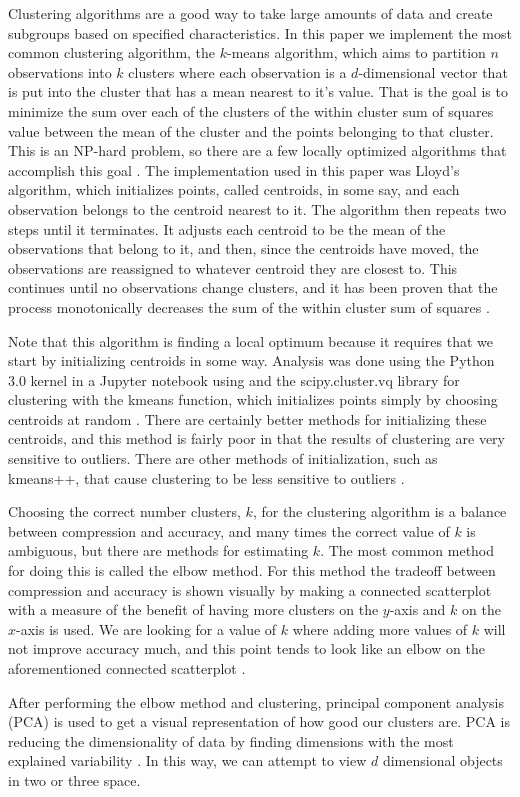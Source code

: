 \documentclass[../main.tex]{subfiles}
\begin{document}
Clustering algorithms are a good way to take large amounts of data and
create subgroups based on specified characteristics. In this paper we
implement the most common clustering algorithm, the $k$-means algorithm, which
aims to partition $n$ observations into $k$ clusters where each observation
is a $d$-dimensional vector that is put into the cluster that has a mean
nearest to it's value. That is the goal is to minimize the sum
over each of the clusters of the within cluster sum of squares value between
the mean of the cluster and the points belonging to that cluster. This is 
an NP-hard problem, so there are a few locally optimized algorithms
that accomplish this goal \cite{wiki1}. The implementation used in this paper was Lloyd's
algorithm, which initializes points, called centroids, in some say, and each
observation belongs to the centroid nearest to it. The algorithm then
repeats two steps until it terminates. It adjusts each centroid to be the
mean of the observations that belong to it, and then, since the centroids
have moved, the observations are reassigned to whatever centroid they are
closest to. This continues until no observations change clusters, and it has
been proven that the process monotonically decreases the sum of the within
cluster sum of squares \cite{kmeans1}.

Note that this algorithm is finding a local optimum because it requires that
we start by initializing centroids in some way. Analysis was done using the 
Python 3.0 kernel in a Jupyter notebook using and the scipy.cluster.vq library for 
clustering with the kmeans function, which initializes points simply by
choosing centroids at random \cite{algorithm1}. There are certainly better methods for
initializing these centroids, and this method is fairly poor in that the
results of clustering are very sensitive to outliers. There are other
methods of initialization, such as kmeans++, that cause clustering to be
less sensitive to outliers \cite{kmeans1}.

Choosing the correct number clusters, $k$, for the clustering algorithm is a
balance between compression and accuracy, and many times the correct value
of $k$ is ambiguous, but there are methods for estimating $k$. The most
common method for doing this is called the elbow method. For this method the
tradeoff between compression and accuracy is shown visually by making a
connected scatterplot with a measure of the benefit of having more clusters
on the $y$-axis and $k$ on the $x$-axis is used. We are looking for a value
of $k$ where adding more values of $k$ will not improve accuracy much, and
this point tends to look like an elbow on the aforementioned connected
scatterplot \cite{elbow1}.

After performing the elbow method and clustering, principal component
analysis (PCA) is used to get a visual representation of how good our clusters
are. PCA is reducing the dimensionality of data by finding dimensions with
the most explained variability \cite{pca1}. In this way, we can attempt to
view $d$ dimensional objects in two or three space.
\end{document}
